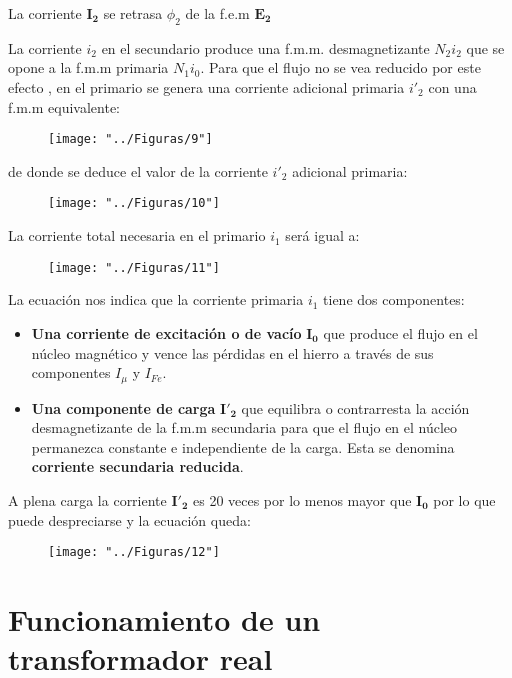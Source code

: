 La corriente $\mathbf{I_{2}}$ se retrasa $\phi_{2}$ de la f.e.m $\mathbf{E_{2}}$

La corriente $i_{2}$ en el secundario produce una f.m.m. desmagnetizante $N_{2}i_{2}$ que se opone a la f.m.m primaria $N_{1}i_{0}$. Para que el flujo no se vea reducido por este efecto , en el primario se genera una corriente adicional primaria $i'_{2}$ con una f.m.m equivalente:

 \begin{figure}[H]
	\centering
	\texttt{[image: "../Figuras/9"]}
\end{figure} 

de donde se deduce el valor de la corriente $i'_{2}$ adicional primaria:

 \begin{figure}[H]
	\centering
	\texttt{[image: "../Figuras/10"]}
\end{figure} 

La corriente total necesaria en el primario $i_{1}$ será igual a:

 \begin{figure}[H]
	\centering
	\texttt{[image: "../Figuras/11"]}
\end{figure} 

La ecuación nos indica que la corriente primaria $i_{1}$ tiene dos componentes:

\begin{itemize}
	\item \textbf{Una corriente de excitación o de vacío} $\mathbf{I_{0}}$ que produce el flujo en el núcleo magnético y vence las pérdidas en el hierro a través de sus componentes $I_{\mu}$ y $I_{Fe}$.
	\item \textbf{Una componente de carga} $\mathbf{I'_{2}}$ que equilibra o contrarresta la acción desmagnetizante de la f.m.m secundaria para que el flujo en el núcleo permanezca constante e independiente de la carga. Esta se denomina \textbf{corriente secundaria reducida}.
\end{itemize}

A plena carga la corriente $\mathbf{I'_{2}}$ es 20 veces por lo menos mayor que $\mathbf{I_{0}}$ por lo que puede despreciarse y la ecuación queda:

 \begin{figure}[H]
	\centering
	\texttt{[image: "../Figuras/12"]}
\end{figure} 

\section{Funcionamiento de un transformador real}

